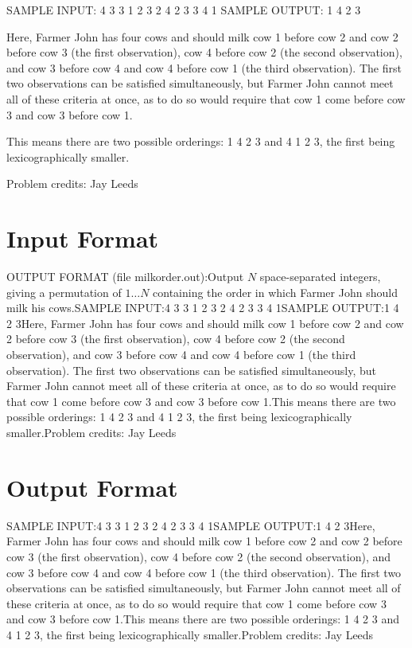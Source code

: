 \documentclass[12pt]{article}
\begin{document}
SAMPLE INPUT:
4 3
3 1 2 3
2 4 2
3 3 4 1
SAMPLE OUTPUT: 
1 4 2 3

Here, Farmer John has four cows and should milk cow 1 before cow 2 and cow 2
before cow 3 (the first observation), cow 4 before cow 2 (the second
observation), and cow 3 before cow 4 and cow 4 before cow 1 (the third
observation).   The first two observations can be satisfied simultaneously, but
Farmer John cannot meet all of these criteria at once, as to do so would require
that cow 1 come before cow 3 and cow 3 before cow 1.  

This means there are two possible orderings: 1 4 2 3 and 4 1 2 3, the first
being lexicographically smaller.


Problem credits: Jay Leeds



\section*{Input Format}
OUTPUT FORMAT (file milkorder.out):Output $N$ space-separated integers, giving a permutation of $1 \ldots N$
containing the order in which Farmer John should milk his cows.SAMPLE INPUT:4 3
3 1 2 3
2 4 2
3 3 4 1SAMPLE OUTPUT:1 4 2 3Here, Farmer John has four cows and should milk cow 1 before cow 2 and cow 2
before cow 3 (the first observation), cow 4 before cow 2 (the second
observation), and cow 3 before cow 4 and cow 4 before cow 1 (the third
observation).   The first two observations can be satisfied simultaneously, but
Farmer John cannot meet all of these criteria at once, as to do so would require
that cow 1 come before cow 3 and cow 3 before cow 1.This means there are two possible orderings: 1 4 2 3 and 4 1 2 3, the first
being lexicographically smaller.Problem credits: Jay Leeds

\section*{Output Format}
SAMPLE INPUT:4 3
3 1 2 3
2 4 2
3 3 4 1SAMPLE OUTPUT:1 4 2 3Here, Farmer John has four cows and should milk cow 1 before cow 2 and cow 2
before cow 3 (the first observation), cow 4 before cow 2 (the second
observation), and cow 3 before cow 4 and cow 4 before cow 1 (the third
observation).   The first two observations can be satisfied simultaneously, but
Farmer John cannot meet all of these criteria at once, as to do so would require
that cow 1 come before cow 3 and cow 3 before cow 1.This means there are two possible orderings: 1 4 2 3 and 4 1 2 3, the first
being lexicographically smaller.Problem credits: Jay Leeds
\end{document}
